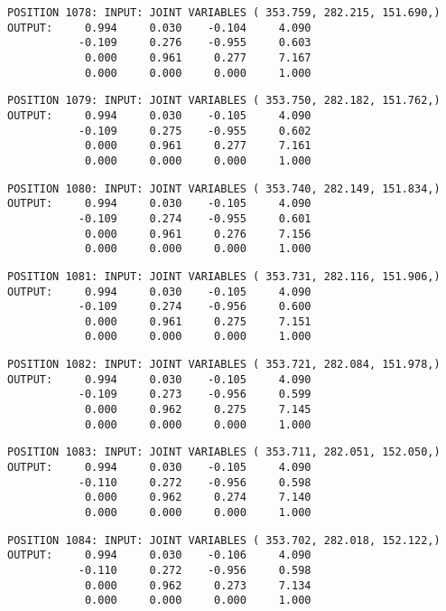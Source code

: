 \begin{verbatim}
POSITION 1078: INPUT: JOINT VARIABLES ( 353.759, 282.215, 151.690,)
OUTPUT:     0.994     0.030    -0.104     4.090
           -0.109     0.276    -0.955     0.603
            0.000     0.961     0.277     7.167
            0.000     0.000     0.000     1.000
\end{verbatim} \pagebreak[1]\begin{verbatim}
POSITION 1079: INPUT: JOINT VARIABLES ( 353.750, 282.182, 151.762,)
OUTPUT:     0.994     0.030    -0.105     4.090
           -0.109     0.275    -0.955     0.602
            0.000     0.961     0.277     7.161
            0.000     0.000     0.000     1.000
\end{verbatim} \pagebreak[1]\begin{verbatim}
POSITION 1080: INPUT: JOINT VARIABLES ( 353.740, 282.149, 151.834,)
OUTPUT:     0.994     0.030    -0.105     4.090
           -0.109     0.274    -0.955     0.601
            0.000     0.961     0.276     7.156
            0.000     0.000     0.000     1.000
\end{verbatim} \pagebreak[1]\begin{verbatim}
POSITION 1081: INPUT: JOINT VARIABLES ( 353.731, 282.116, 151.906,)
OUTPUT:     0.994     0.030    -0.105     4.090
           -0.109     0.274    -0.956     0.600
            0.000     0.961     0.275     7.151
            0.000     0.000     0.000     1.000
\end{verbatim} \pagebreak[1]\begin{verbatim}
POSITION 1082: INPUT: JOINT VARIABLES ( 353.721, 282.084, 151.978,)
OUTPUT:     0.994     0.030    -0.105     4.090
           -0.109     0.273    -0.956     0.599
            0.000     0.962     0.275     7.145
            0.000     0.000     0.000     1.000
\end{verbatim} \pagebreak[1]\begin{verbatim}
POSITION 1083: INPUT: JOINT VARIABLES ( 353.711, 282.051, 152.050,)
OUTPUT:     0.994     0.030    -0.105     4.090
           -0.110     0.272    -0.956     0.598
            0.000     0.962     0.274     7.140
            0.000     0.000     0.000     1.000
\end{verbatim} \pagebreak[1]\begin{verbatim}
POSITION 1084: INPUT: JOINT VARIABLES ( 353.702, 282.018, 152.122,)
OUTPUT:     0.994     0.030    -0.106     4.090
           -0.110     0.272    -0.956     0.598
            0.000     0.962     0.273     7.134
            0.000     0.000     0.000     1.000
\end{verbatim} \pagebreak[1]\begin{verbatim}

\end{verbatim}

